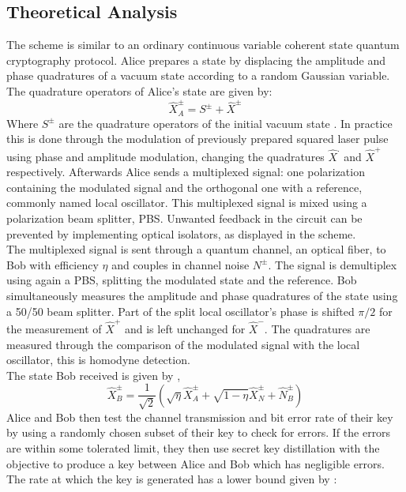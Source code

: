 \begin{refsection}
\subsection{Theoretical Analysis}
The scheme is similar to an ordinary continuous variable coherent state quantum cryptography protocol. Alice prepares a state by displacing the amplitude and phase quadratures of a vacuum state according to a random Gaussian variable. The quadrature
operators of Alice’s state are given by:\\
\begin{equation}
\hat{X}^\pm_A=S^\pm+\hat{X}^\pm
\end{equation} 
Where $S^\pm$ are the quadrature operators of the initial vacuum state \cite{Weedbrook2004}. In practice this is done through the modulation of previously prepared squared laser pulse using phase and amplitude modulation, changing the quadratures $\hat{X}^.$ and $\hat{X}^+$ respectively. Afterwards Alice sends a multiplexed signal: one polarization containing the modulated signal and the orthogonal one with a reference, commonly named local oscillator. This multiplexed signal is mixed using a polarization beam splitter, PBS. Unwanted feedback in the circuit can be prevented by implementing optical isolators, as displayed in the scheme.\\
The multiplexed signal is sent through a quantum channel, an optical fiber, to Bob with efficiency $\eta$ and couples in channel noise $N^\pm$. The signal is demultiplex using again a PBS, splitting the modulated state and the reference. Bob simultaneously measures the amplitude and phase quadratures of the state using a 50/50 beam splitter. Part of the split local oscillator's phase is shifted $\pi/2$ for the measurement of $\hat{X}^+$ and is left unchanged for $\hat{X}^-$. The quadratures are measured through the comparison of the modulated signal with the local oscillator, this is homodyne detection.\\
The state Bob received is given by \cite{Weedbrook2004},
\begin{equation}
\hat{X}_B^\pm=\frac{1}{\sqrt{2}}\left(\sqrt{\eta}\hat{X}^\pm_A+\sqrt{1-\eta}\hat{X}^\pm_N+\hat{N}_B^\pm\right)
\end{equation}
Alice and Bob then test the channel transmission and bit error rate of their key by using a randomly chosen subset of their key to check for errors. If the errors are within some tolerated limit, they then use secret key distillation with the objective to produce a key between Alice and Bob which has negligible errors. The rate at which the key is generated has a lower bound given by \cite{Weedbrook2004}:\\

\end{refsection}
